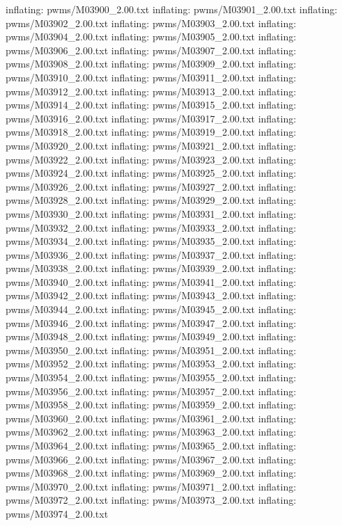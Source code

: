 \documentclass[letterpaper,10pt,english]{sphinxmanual}
\begin{document}
{\begin{sphinxVerbatim}[commandchars=\\\{\}]
  inflating: pwms/M03900\_2.00.txt
  inflating: pwms/M03901\_2.00.txt
  inflating: pwms/M03902\_2.00.txt
  inflating: pwms/M03903\_2.00.txt
  inflating: pwms/M03904\_2.00.txt
  inflating: pwms/M03905\_2.00.txt
  inflating: pwms/M03906\_2.00.txt
  inflating: pwms/M03907\_2.00.txt
  inflating: pwms/M03908\_2.00.txt
  inflating: pwms/M03909\_2.00.txt
  inflating: pwms/M03910\_2.00.txt
  inflating: pwms/M03911\_2.00.txt
  inflating: pwms/M03912\_2.00.txt
  inflating: pwms/M03913\_2.00.txt
  inflating: pwms/M03914\_2.00.txt
  inflating: pwms/M03915\_2.00.txt
  inflating: pwms/M03916\_2.00.txt
  inflating: pwms/M03917\_2.00.txt
  inflating: pwms/M03918\_2.00.txt
  inflating: pwms/M03919\_2.00.txt
  inflating: pwms/M03920\_2.00.txt
  inflating: pwms/M03921\_2.00.txt
  inflating: pwms/M03922\_2.00.txt
  inflating: pwms/M03923\_2.00.txt
  inflating: pwms/M03924\_2.00.txt
  inflating: pwms/M03925\_2.00.txt
  inflating: pwms/M03926\_2.00.txt
  inflating: pwms/M03927\_2.00.txt
  inflating: pwms/M03928\_2.00.txt
  inflating: pwms/M03929\_2.00.txt
  inflating: pwms/M03930\_2.00.txt
  inflating: pwms/M03931\_2.00.txt
  inflating: pwms/M03932\_2.00.txt
  inflating: pwms/M03933\_2.00.txt
  inflating: pwms/M03934\_2.00.txt
  inflating: pwms/M03935\_2.00.txt
  inflating: pwms/M03936\_2.00.txt
  inflating: pwms/M03937\_2.00.txt
  inflating: pwms/M03938\_2.00.txt
  inflating: pwms/M03939\_2.00.txt
  inflating: pwms/M03940\_2.00.txt
  inflating: pwms/M03941\_2.00.txt
  inflating: pwms/M03942\_2.00.txt
  inflating: pwms/M03943\_2.00.txt
  inflating: pwms/M03944\_2.00.txt
  inflating: pwms/M03945\_2.00.txt
  inflating: pwms/M03946\_2.00.txt
  inflating: pwms/M03947\_2.00.txt
  inflating: pwms/M03948\_2.00.txt
  inflating: pwms/M03949\_2.00.txt
  inflating: pwms/M03950\_2.00.txt
  inflating: pwms/M03951\_2.00.txt
  inflating: pwms/M03952\_2.00.txt
  inflating: pwms/M03953\_2.00.txt
  inflating: pwms/M03954\_2.00.txt
  inflating: pwms/M03955\_2.00.txt
  inflating: pwms/M03956\_2.00.txt
  inflating: pwms/M03957\_2.00.txt
  inflating: pwms/M03958\_2.00.txt
  inflating: pwms/M03959\_2.00.txt
  inflating: pwms/M03960\_2.00.txt
  inflating: pwms/M03961\_2.00.txt
  inflating: pwms/M03962\_2.00.txt
  inflating: pwms/M03963\_2.00.txt
  inflating: pwms/M03964\_2.00.txt
  inflating: pwms/M03965\_2.00.txt
  inflating: pwms/M03966\_2.00.txt
  inflating: pwms/M03967\_2.00.txt
  inflating: pwms/M03968\_2.00.txt
  inflating: pwms/M03969\_2.00.txt
  inflating: pwms/M03970\_2.00.txt
  inflating: pwms/M03971\_2.00.txt
  inflating: pwms/M03972\_2.00.txt
  inflating: pwms/M03973\_2.00.txt
  inflating: pwms/M03974\_2.00.txt

\end{sphinxVerbatim}}
\end{document}
